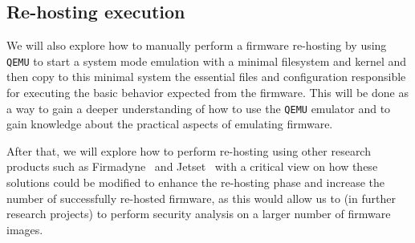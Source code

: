 \subsection{Re-hosting execution}

We will also explore how to manually perform a firmware re-hosting by using {\tt QEMU} to start a system mode emulation with a minimal filesystem and kernel and then copy to this minimal system the essential files and configuration responsible for executing the basic behavior expected from the firmware. This will be done as a way to gain a deeper understanding of how to use the {\tt QEMU} emulator and to gain knowledge about the practical aspects of emulating firmware.

After that, we will explore how to perform re-hosting using other research products such as Firmadyne~\cite{firmadyne} and Jetset~\cite{jetset} with a critical view on how these solutions could be modified to enhance the re-hosting phase and increase the number of successfully re-hosted firmware, as this would allow us to (in further research projects) to perform security analysis on a larger number of firmware images.